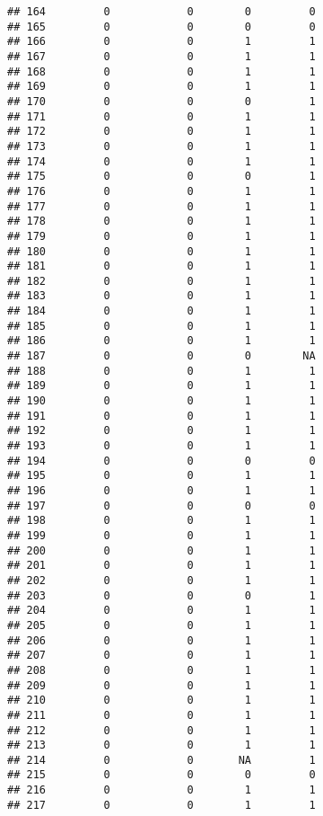 \documentclass[
]{article}
\begin{document}
\begin{verbatim}
## 164         0            0        0         0
## 165         0            0        0         0
## 166         0            0        1         1
## 167         0            0        1         1
## 168         0            0        1         1
## 169         0            0        1         1
## 170         0            0        0         1
## 171         0            0        1         1
## 172         0            0        1         1
## 173         0            0        1         1
## 174         0            0        1         1
## 175         0            0        0         1
## 176         0            0        1         1
## 177         0            0        1         1
## 178         0            0        1         1
## 179         0            0        1         1
## 180         0            0        1         1
## 181         0            0        1         1
## 182         0            0        1         1
## 183         0            0        1         1
## 184         0            0        1         1
## 185         0            0        1         1
## 186         0            0        1         1
## 187         0            0        0        NA
## 188         0            0        1         1
## 189         0            0        1         1
## 190         0            0        1         1
## 191         0            0        1         1
## 192         0            0        1         1
## 193         0            0        1         1
## 194         0            0        0         0
## 195         0            0        1         1
## 196         0            0        1         1
## 197         0            0        0         0
## 198         0            0        1         1
## 199         0            0        1         1
## 200         0            0        1         1
## 201         0            0        1         1
## 202         0            0        1         1
## 203         0            0        0         1
## 204         0            0        1         1
## 205         0            0        1         1
## 206         0            0        1         1
## 207         0            0        1         1
## 208         0            0        1         1
## 209         0            0        1         1
## 210         0            0        1         1
## 211         0            0        1         1
## 212         0            0        1         1
## 213         0            0        1         1
## 214         0            0       NA         1
## 215         0            0        0         0
## 216         0            0        1         1
## 217         0            0        1         1

\end{verbatim}
\end{document}
